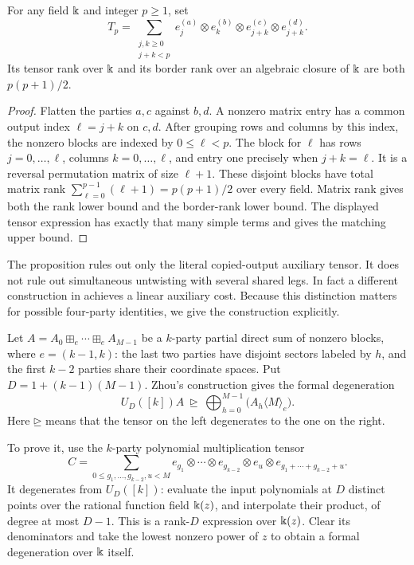 \begin{proposition}\label{prop:copied-output}
For any field $\Bbbk$ and integer $p\geq1$, set
\[
 T_p=\sum_{\substack{j,k\geq0\\j+k<p}}
 e_j^{(a)}\otimes e_k^{(b)}\otimes
 e_{j+k}^{(c)}\otimes e_{j+k}^{(d)}.
\]
Its tensor rank over $\Bbbk$ and its border rank over an algebraic closure of $\Bbbk$ are both $p(p+1)/2$.
\end{proposition}
\begin{proof}
Flatten the parties $a,c$ against $b,d$. A nonzero matrix entry has a common output index $\ell=j+k$ on $c,d$. After grouping rows and columns by this index, the nonzero blocks are indexed by $0\leq\ell<p$. The block for $\ell$ has rows $j=0,\ldots,\ell$, columns $k=0,\ldots,\ell$, and entry one precisely when $j+k=\ell$. It is a reversal permutation matrix of size $\ell+1$. These disjoint blocks have total matrix rank $\sum_{\ell=0}^{p-1}(\ell+1)=p(p+1)/2$ over every field. Matrix rank gives both the rank lower bound and the border-rank lower bound. The displayed tensor expression has exactly that many simple terms and gives the matching upper bound.
\end{proof}

The proposition rules out only the literal copied-output auxiliary tensor. It does not rule out simultaneous untwisting with several shared legs. In fact a different construction in \cite[Theorem 3.4 and Corollary 3.5]{Zhou2026} achieves a linear auxiliary cost. Because this distinction matters for possible four-party identities, we give the construction explicitly.

Let $A=A_0\boxplus_e\cdots\boxplus_e A_{M-1}$ be a $k$-party partial direct sum of nonzero blocks, where $e=(k-1,k)$: the last two parties have disjoint sectors labeled by $h$, and the first $k-2$ parties share their coordinate spaces. Put $D=1+(k-1)(M-1)$. Zhou's construction gives the formal degeneration
\begin{equation}\label{eq:several-shared-legs}
 U_D([k])A\ \unrhd\
 \bigoplus_{h=0}^{M-1}\bigl(A_h\langle M\rangle_e\bigr).
\end{equation}
Here $\unrhd$ means that the tensor on the left degenerates to the one on the right.

To prove it, use the $k$-party polynomial multiplication tensor
\[
 C=\sum_{0\leq g_1,\ldots,g_{k-2},u<M}
 e_{g_1}\otimes\cdots\otimes e_{g_{k-2}}\otimes e_u
 \otimes e_{g_1+\cdots+g_{k-2}+u}.
\]
It degenerates from $U_D([k])$: evaluate the input polynomials at $D$ distinct points over the rational function field $\Bbbk(z)$, and interpolate their product, of degree at most $D-1$. This is a rank-$D$ expression over $\Bbbk(z)$. Clear its denominators and take the lowest nonzero power of $z$ to obtain a formal degeneration over $\Bbbk$ itself.


